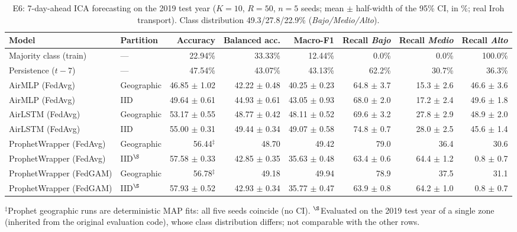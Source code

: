 \documentclass[a4paper,fleqn]{cas-dc}
\begin{document}
\begin{table}[t]
\centering
\caption{E6: 7-day-ahead ICA forecasting on the 2019 test year ($K{=}10$, $R{=}50$, $n{=}5$ seeds; mean $\pm$ half-width of the 95\% CI, in \%; real Iroh transport). Class distribution 49.3/27.8/22.9\% (\textit{Bajo/Medio/Alto}).}
\label{tab:e6}
\scriptsize
\setlength{\tabcolsep}{4pt}
\begin{tabular}{l l r r r r r r}
\toprule
\textbf{Model} & \textbf{Partition} & \textbf{Accuracy} & \textbf{Balanced acc.} & \textbf{Macro-F1} & \textbf{Recall \textit{Bajo}} & \textbf{Recall \textit{Medio}} & \textbf{Recall \textit{Alto}} \\
\midrule
Majority class (train)          & ---        & 22.94\% & 33.33\% & 12.44\% & 0.0\% & 0.0\% & 100.0\% \\
Persistence ($t{-}7$)           & ---        & 47.54\% & 43.07\% & 43.13\% & 62.2\% & 30.7\% & 36.3\% \\
\midrule
AirMLP (FedAvg)                 & Geographic & 46.85 $\pm$ 1.02 & 42.22 $\pm$ 0.48 & 40.25 $\pm$ 0.23 & 64.8 $\pm$ 3.7 & 15.3 $\pm$ 2.6 & 46.6 $\pm$ 3.6 \\
AirMLP (FedAvg)                 & IID        & 49.64 $\pm$ 0.61 & 44.93 $\pm$ 0.61 & 43.05 $\pm$ 0.93 & 68.0 $\pm$ 2.0 & 17.2 $\pm$ 2.4 & 49.6 $\pm$ 1.8 \\
AirLSTM (FedAvg)                & Geographic & 53.17 $\pm$ 0.55 & 48.77 $\pm$ 0.42 & 48.11 $\pm$ 0.52 & 69.6 $\pm$ 3.2 & 27.8 $\pm$ 2.9 & 48.9 $\pm$ 2.0 \\
AirLSTM (FedAvg)                & IID        & 55.00 $\pm$ 0.31 & 49.44 $\pm$ 0.34 & 49.07 $\pm$ 0.58 & 74.8 $\pm$ 0.7 & 28.0 $\pm$ 2.5 & 45.6 $\pm$ 1.4 \\
\midrule
ProphetWrapper (FedAvg)         & Geographic & 56.44$^{\ddagger}$ & 48.70 & 49.42 & 79.0 & 36.4 & 30.6 \\
ProphetWrapper (FedAvg)         & IID$^{\S}$ & 57.58 $\pm$ 0.33 & 42.85 $\pm$ 0.35 & 35.63 $\pm$ 0.48 & 63.4 $\pm$ 0.6 & 64.4 $\pm$ 1.2 & 0.8 $\pm$ 0.7 \\
ProphetWrapper (FedGAM)         & Geographic & 56.78$^{\ddagger}$ & 49.18 & 49.94 & 78.9 & 37.5 & 31.1 \\
ProphetWrapper (FedGAM)         & IID$^{\S}$ & 57.93 $\pm$ 0.52 & 42.93 $\pm$ 0.34 & 35.77 $\pm$ 0.47 & 63.9 $\pm$ 0.8 & 64.2 $\pm$ 1.0 & 0.8 $\pm$ 0.7 \\
\bottomrule
\end{tabular}
\vspace{0.3em}

{\scriptsize $^{\ddagger}$Prophet geographic runs are deterministic MAP fits: all five seeds coincide (no CI). $^{\S}$Evaluated on the 2019 test year of a single zone (inherited from the original evaluation code), whose class distribution differs; not comparable with the other rows.}
\end{table}
\end{document}
